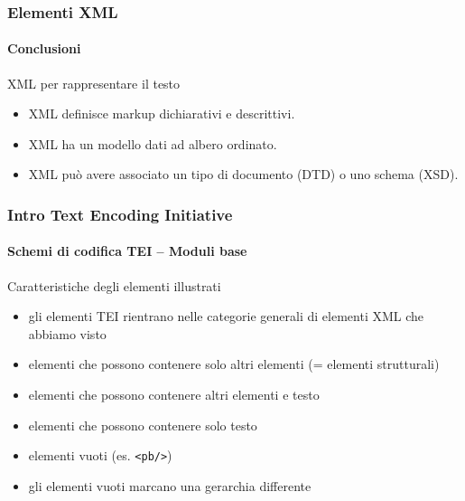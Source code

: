 \begin{frame}
    \frametitle{Elementi XML}
    \framesubtitle{Conclusioni}
    \addtocounter{nframe}{1}

    \begin{block}{XML per rappresentare il testo}
        \begin{itemize}
            \item XML definisce markup dichiarativi e descrittivi.
            \item XML ha un modello dati ad albero ordinato.
            \item XML può avere associato un tipo di documento (DTD) o uno schema (XSD).
        \end{itemize}

    \end{block}

\end{frame}


\begin{frame}
	\frametitle{Intro Text Encoding Initiative}
	\framesubtitle{Schemi di codifica TEI – Moduli base}
	\addtocounter{nframe}{1}

	\begin{block}{Caratteristiche degli elementi illustrati}
        \begin{itemize}
            \item gli elementi TEI rientrano nelle categorie generali di
            elementi XML che abbiamo visto
            \item elementi che possono contenere solo altri elementi (=
            elementi strutturali)
            \item elementi che possono contenere altri elementi e testo
            \item elementi che possono contenere solo testo
            \item  elementi vuoti (es. \texttt{<pb/>})
            \item  gli elementi vuoti marcano una gerarchia differente
        \end{itemize}
    \end{block}
\end{frame}


